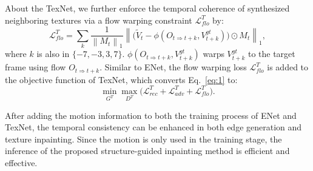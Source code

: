 About the TexNet, we further enforce the temporal coherence of synthesized neighboring textures via a flow warping constraint $\mathcal{L}^T_{flo}$ by: 
\begin{equation}
	\label{eq:inp_flow}
		\mathcal{L}^T_{flo}=\sum_{k}\frac{1}{\left\|M_{t} \right\|_1}\left\|\big(\widetilde{V}_{t}-\phi(O_{t\Rightarrow t+k},V_{t+k}^{gt})\big)\odot M_{t}\right\|_1,
	\end{equation}
where  $k$ is also in $\{-7,-3, 3, 7\}$. $\phi(O_{t\Rightarrow t+k},V_{t+k}^{gt})$ warps $V_{t+k}^{gt}$ to the target frame using flow $O_{t\Rightarrow t+k}$. 
{\color{blue}Similar to ENet, the flow warping loss $\mathcal{L}^T_{flo}$ is added to the objective function of TexNet, which converts Eq.~\eqref{eq:1}
to:}
\begin{equation}
\label{eq:1_}
\min\limits_{G^T} \max \limits_{D^T} \big(\mathcal{L}^{T}_{rec}+\mathcal{L}^T_{adv} +\mathcal{L}^T_{flo}\big).
\end{equation}

After adding the motion information to both the training process of ENet and TexNet, the temporal consistency can be enhanced in both edge generation and texture inpainting.
Since the motion is only used in the training stage, the inference of the proposed structure-guided inpainting method is efficient and effective.








	